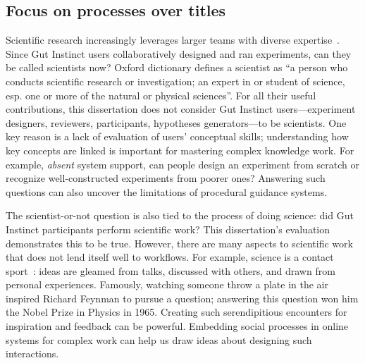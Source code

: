 \subsection{Focus on processes over titles}
Scientific research increasingly leverages larger teams with diverse expertise~\cite{wu2019large}. Since Gut Instinct users collaboratively designed and ran experiments, can they be called scientists now? Oxford dictionary defines a scientist as “a person who conducts scientific research or investigation; an expert in or student of science, esp. one or more of the natural or physical sciences”. For all their useful contributions, this dissertation does not consider Gut Instinct users---experiment designers, reviewers, participants, hypotheses generators---to be scientists. One key reason is a lack of evaluation of users' conceptual skills; understanding how key concepts are linked is important for mastering complex knowledge work. For example, \textit{absent} system support, can people design an experiment from scratch or recognize well-constructed experiments from poorer ones? Answering such questions can also uncover the limitations of procedural guidance systems.

The scientist-or-not question is also tied to the process of doing science: did Gut Instinct participants perform scientific work? This dissertation's evaluation demonstrates this to be true. However, there are many aspects to scientific work that does not lend itself well to workflows. For example, science is a contact sport~\cite{latour2013laboratory}: ideas are gleamed from talks, discussed with others, and drawn from personal experiences. Famously, watching someone throw a plate in the air inspired Richard Feynman to pursue a question; answering this question won him the Nobel Prize in Physics in 1965. Creating such serendipitious encounters for inspiration and feedback can be powerful. Embedding social processes in online systems for complex work can help us draw ideas about designing such interactions.\\




